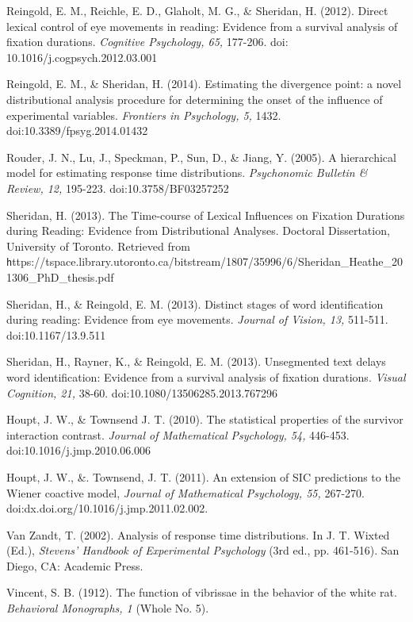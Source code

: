 \documentclass[man]{apa}%
\begin{document}
Reingold, E. M., Reichle, E. D., Glaholt, M. G., \& Sheridan, H. (2012). Direct lexical control of eye movements in reading: Evidence from a survival analysis of fixation durations. \emph{Cognitive Psychology, 65,} 177-206. doi: 10.1016/j.cogpsych.2012.03.001 


Reingold, E. M., \& Sheridan, H. (2014). Estimating the divergence point: a novel distributional analysis procedure for determining the onset of the influence of experimental variables. \emph{Frontiers in Psychology, 5,} 1432. doi:10.3389/fpsyg.2014.01432

Rouder, J. N., Lu, J., Speckman, P., Sun, D., \& Jiang, Y. (2005). A hierarchical model for estimating response time distributions. \emph{Psychonomic Bulletin \& Review, 12,} 195-223. doi:10.3758/BF03257252

Sheridan, H. (2013). The Time-course of Lexical Influences on Fixation Durations during Reading: Evidence from Distributional Analyses. Doctoral Dissertation, University of Toronto. Retrieved from {\texttt https://tspace.library.utoronto.ca/bitstream/1807/35996/6/Sheridan\_Heathe\_201306\_PhD\_thesis.pdf}

Sheridan, H., \& Reingold, E. M. (2013). Distinct stages of word identification during reading: Evidence from eye movements. \emph{Journal of Vision, 13,} 511-511. doi:10.1167/13.9.511

Sheridan, H., Rayner, K., \& Reingold, E. M. (2013). Unsegmented text delays word identification: Evidence from a survival analysis of fixation durations. \emph{Visual Cognition, 21,} 38-60. doi:10.1080/13506285.2013.767296

Houpt, J. W., \& Townsend J. T. (2010). The statistical properties of the survivor interaction contrast. \emph{Journal of Mathematical Psychology, 54,} 446-453. doi:10.1016/j.jmp.2010.06.006

Houpt, J. W., \&. Townsend, J. T. (2011). An extension of SIC predictions to the Wiener coactive model, \emph{Journal of Mathematical Psychology, 55,}  267-270. doi:dx.doi.org/10.1016/j.jmp.2011.02.002.


Van Zandt, T. (2002). Analysis of response time distributions. In J. T. Wixted (Ed.), \emph{Stevens' Handbook of Experimental Psychology} (3rd ed., pp. 461-516). San Diego, CA: Academic Press. 


Vincent, S. B. (1912). The function of vibrissae in the behavior of the white rat. \emph{Behavioral Monographs, 1} (Whole No. 5).



\end{document}
